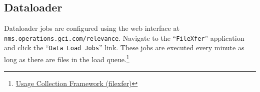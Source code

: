 

\subsection{Dataloader}
Dataloader jobs are configured using the web interface at
\texttt{nms.operations.gci.com/relevance}. Navigate to the
``\texttt{FileXfer}'' application and click the
``\texttt{Data Load Jobs}'' link. These jobs are executed every
minute as long as there are files in the load queue.\footnote{\href{http://oss-wiki.operations.gci.com/dev/index.php/Usage\_Collection\_Framework\_(filexfer)}{Usage Collection Framework (filexfer)}}

